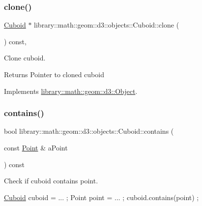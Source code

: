 \subsubsection{\texorpdfstring{clone()}{clone()}}
{\footnotesize\ttfamily \hyperlink{classlibrary_1_1math_1_1geom_1_1d3_1_1objects_1_1_cuboid}{Cuboid} $\ast$ library\+::math\+::geom\+::d3\+::objects\+::\+Cuboid\+::clone (\begin{DoxyParamCaption}{ }\end{DoxyParamCaption}) const\hspace{0.3cm}{\ttfamily [override]}, {\ttfamily [virtual]}}



Clone cuboid. 

\begin{DoxyReturn}{Returns}
Pointer to cloned cuboid 
\end{DoxyReturn}


Implements \hyperlink{classlibrary_1_1math_1_1geom_1_1d3_1_1_object_a1a784c6b359e0eb97cd34fabc42f2f3f}{library\+::math\+::geom\+::d3\+::\+Object}.

\mbox{\label{classlibrary_1_1math_1_1geom_1_1d3_1_1objects_1_1_cuboid_a4df75ac5e497a240dd593b32213dee52}} 
\subsubsection{\texorpdfstring{contains()}{contains()}\hspace{0.1cm}{\footnotesize\ttfamily [1/3]}}
{\footnotesize\ttfamily bool library\+::math\+::geom\+::d3\+::objects\+::\+Cuboid\+::contains (\begin{DoxyParamCaption}\item[{const \hyperlink{classlibrary_1_1math_1_1geom_1_1d3_1_1objects_1_1_point}{Point} \&}]{a\+Point }\end{DoxyParamCaption}) const}



Check if cuboid contains point. 


\begin{DoxyCode}
\hyperlink{classlibrary_1_1math_1_1geom_1_1d3_1_1objects_1_1_cuboid_ac42299f962fab284a76a46d4ea4e6fa2}{Cuboid} cuboid = ... ;
Point point = ... ;
cuboid.contains(point) ;
\end{DoxyCode}



